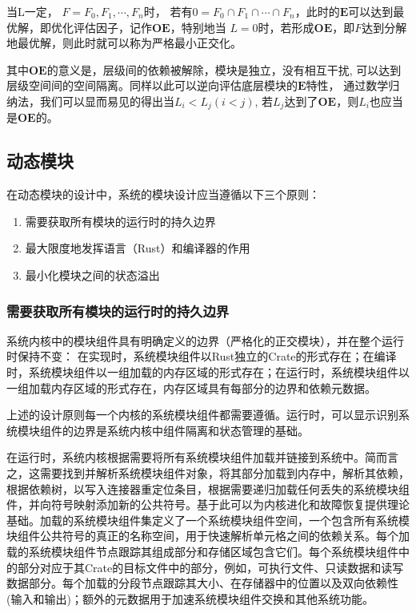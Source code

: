 当L一定， $F = {F_{0}, F_{1}, \cdots, F_{n}}$时， 若有$0 = {F_{0} \cap F_{1} \cap \cdots \cap F_{n}}$，此时的$\boldsymbol{E}$可以达到最优解，即优化评估因子，记作$\boldsymbol{OE}$，特别地当 $L = 0$时，若形成$\boldsymbol{OE}$，即$F$达到分解地最优解，则此时就可以称为严格最小正交化。

其中$\boldsymbol{OE}$的意义是，层级间的依赖被解除，模块是独立，没有相互干扰, 可以达到层级空间间的空间隔离。同样以此可以逆向评估底层模块的$\boldsymbol{E}$特性， 通过数学归纳法，我们可以显而易见的得出当$L_{i} < L_{j} (i < j)$, 若$L_{j}$达到了$\boldsymbol{OE}$，则$L_{i}$也应当是$\boldsymbol{OE}$的。

\subsection{动态模块}

在动态模块的设计中，系统的模块设计应当遵循以下三个原则： \begin{enumerate}
    \item 需要获取所有模块的运行时的持久边界
    \item 最大限度地发挥语言（Rust）和编译器的作用
    \item 最小化模块之间的状态溢出
\end{enumerate}

\subsubsection{需要获取所有模块的运行时的持久边界}

系统内核中的模块组件具有明确定义的边界（严格化的正交模块），并在整个运行时保持不变： 在实现时，系统模块组件以Rust独立的Crate的形式存在；在编译时，系统模块组件以一组加载的内存区域的形式存在；在运行时，系统模块组件以一组加载内存区域的形式存在，内存区域具有每部分的边界和依赖元数据。

上述的设计原则每一个内核的系统模块组件都需要遵循。运行时，可以显示识别系统模块组件的边界是系统内核中组件隔离和状态管理的基础。

在运行时，系统内核根据需要将所有系统模块组件加载并链接到系统中。简而言之，这需要找到并解析系统模块组件对象，将其部分加载到内存中，解析其依赖，根据依赖树，以写入连接器重定位条目，根据需要递归加载任何丢失的系统模块组件，并向符号映射添加新的公共符号。基于此可以为内核进化和故障恢复提供理论基础。加载的系统模块组件集定义了一个系统模块组件空间，一个包含所有系统模块组件公共符号的真正的名称空间，用于快速解析单元格之间的依赖关系。每个加载的系统模块组件节点跟踪其组成部分和存储区域包含它们。每个系统模块组件中的部分对应于其Crate的目标文件中的部分，例如，可执行文件、只读数据和读写数据部分。每个加载的分段节点跟踪其大小、在存储器中的位置以及双向依赖性(输入和输出)；额外的元数据用于加速系统模块组件交换和其他系统功能。

